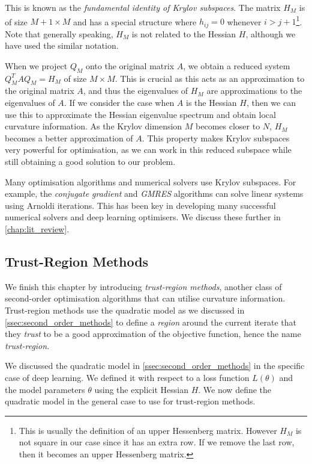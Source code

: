 This is known as the \textit{fundamental identity of Krylov subspaces}. The matrix $H_M$ is of size $M+1 \times M$ and has a special structure where $h_{ij} = 0$ whenever $i > j + 1$\footnote{This is usually the definition of an upper Hessenberg matrix. However $H_M$ is not square in our case since it has an extra row. If we remove the last row, then it becomes an upper Hessenberg matrix.}. Note that generally speaking, $H_M$ is not related to the Hessian $H$, although we have used the similar notation.

When we project $Q_M$ onto the original matrix $A$, we obtain a reduced system $Q_M^T A Q_M = H_M$ of size $M \times M$. This is crucial as this acts as an approximation to the original matrix $A$, and thus the eigenvalues of $H_M$ are approximations to the eigenvalues of $A$. If we consider the case when $A$ is the Hessian $H$, then we can use this to approximate the Hessian eigenvalue spectrum and obtain local curvature information. As the Krylov dimension $M$ becomes closer to $N$, $H_M$ becomes a better approximation of $A$. This property makes Krylov subspaces very powerful for optimisation, as we can work in this reduced subspace while still obtaining a good solution to our problem.

Many optimisation algorithms and numerical solvers use Krylov subspaces. For example, the \textit{conjugate gradient} and \textit{GMRES} algorithms can solve linear systems using Arnoldi iterations. This has been key in developing many successful numerical solvers and deep learning optimisers. We discuss these further in \cref{chap:lit_review}.

\subsection{Trust-Region Methods}
\label{ssec:trust_region_methods}

We finish this chapter by introducing \textit{trust-region methods}, another class of second-order optimisation algorithms that can utilise curvature information. Trust-region methods use the quadratic model as we discussed in \cref{ssec:second_order_methods} to define a \textit{region} around the current iterate that they \textit{trust} to be a good approximation of the objective function, hence the name \textit{trust-region}. 

We discussed the quadratic model in \cref{ssec:second_order_methods} in the specific case of deep learning. We defined it with respect to a loss function $L(\theta)$ and the model parameters $\theta$ using the explicit Hessian $H$. We now define the quadratic model in the general case to use for trust-region methods.

